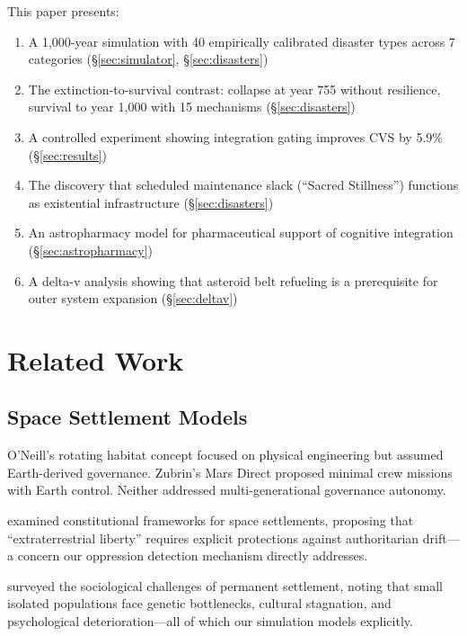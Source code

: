 \documentclass[12pt,a4paper]{article}
\begin{document}
This paper presents:
\begin{enumerate}
    \item A 1,000-year simulation with 40 empirically calibrated disaster types across 7 categories (\S\ref{sec:simulator}, \S\ref{sec:disasters})
    \item The extinction-to-survival contrast: collapse at year 755 without resilience, survival to year 1,000 with 15 mechanisms (\S\ref{sec:disasters})
    \item A controlled experiment showing integration gating improves CVS by 5.9\% (\S\ref{sec:results})
    \item The discovery that scheduled maintenance slack (``Sacred Stillness'') functions as existential infrastructure (\S\ref{sec:disasters})
    \item An astropharmacy model for pharmaceutical support of cognitive integration (\S\ref{sec:astropharmacy})
    \item A delta-v analysis showing that asteroid belt refueling is a prerequisite for outer system expansion (\S\ref{sec:deltav})
\end{enumerate}


\section{Related Work}

\subsection{Space Settlement Models}

O'Neill's rotating habitat concept \citep{oneill1977high} focused on physical engineering but assumed Earth-derived governance. Zubrin's Mars Direct \citep{zubrin1996case} proposed minimal crew missions with Earth control. Neither addressed multi-generational governance autonomy.

\citet{cockell2006space} examined constitutional frameworks for space settlements, proposing that ``extraterrestrial liberty'' requires explicit protections against authoritarian drift---a concern our oppression detection mechanism directly addresses.

\citet{impey2015beyond} surveyed the sociological challenges of permanent settlement, noting that small isolated populations face genetic bottlenecks, cultural stagnation, and psychological deterioration---all of which our simulation models explicitly.
\end{document}

